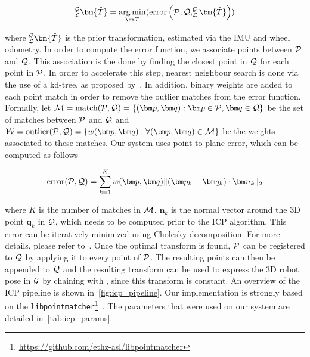 \begin{equation}
	_{\lidarf}^{\mapf}\bm{\hat{T}} = \argmin_{\bm T} (\text{error} \left(\readpc, \refpc, _{\lidarf}^{\mapf}\bm{\check{T}} \right))
\end{equation}

where $_{\lidarf}^{\mapf}\bm{\check{T}}$ is the prior transformation, estimated via the \ac{IMU} and wheel odometry.
In order to compute the error function, we associate points between $\mathcal{P}$ and $\mathcal{Q}$.
This association is the done by finding the closest point in $\mathcal{Q}$ for each point in $\mathcal{P}$.
In order to accelerate this step, nearest neighbour search is done via the use of a kd-tree, as proposed by~\citet{Elseberg2012}.
In addition, binary weights are added to each point match in order to remove the outlier matches from the error function.
Formally, let $\match = \text{match}(\readpc, \refpc) = \{(\bm p, \bm q) : \bm p \in \readpc, \bm q \in \refpc \}$ be the set of matches between $\mathcal{P}$ and $\mathcal{Q}$ and $\weight = \text{outlier}(\readpc, \refpc) = \{w(\bm p, \bm q) : \forall(\bm p, \bm q) \in \match\}$ be the weights associated to these matches.
Our system uses point-to-plane error, which can be computed as follows

\begin{equation}
	\text{error}(\readpc, \refpc) = \sum_{k=1}^{K} w(\bm p, \bm q) \lVert (\bm p_k - \bm q_k) \cdot \bm n_k \rVert_2
\end{equation}

where $K$ is the number of matches in $\mathcal{M}$. 
$\bm n_k$ is the normal vector around the 3D point $\bm q_k$ in $\mathcal{Q}$, which needs to be computed prior to the \ac{ICP} algorithm.
This error can be iteratively minimized using Cholesky decomposition.
For more details, please refer to~\citep{Pomerleau2015}.
Once the optimal transform is found, $\mathcal{P}$ can be registered to $\mathcal{Q}$ by applying it to every point of $\mathcal{P}$. 
The resulting points can then be appended to $\mathcal{Q}$ and the resulting transform \transform{\lidarf}{\mapf} can be used to express the 3D robot pose in $\mathcal{G}$ by chaining with \transform{\lidarf}{\robotf}, since this transform is constant.
An overview of the \ac{ICP} pipeline is shown in~\autoref{fig:icp_pipeline}.
Our implementation is strongly based on the \texttt{libpointmatcher}\footnote{\url{https://github.com/ethz-asl/libpointmatcher}}~\citep{Pomerleau2013}.
The parameters that were used on our system are detailed in~\autoref{tab:icp_params}.


